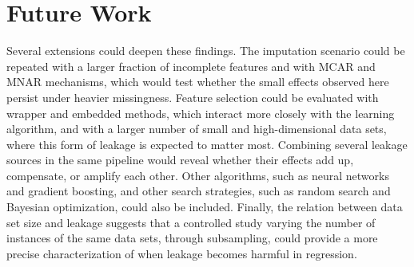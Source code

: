 \section{Future Work}

Several extensions could deepen these findings. The imputation scenario could be
repeated with a larger fraction of incomplete features and with MCAR and MNAR
mechanisms, which would test whether the small effects observed here persist
under heavier missingness. Feature selection could be evaluated with wrapper and
embedded methods, which interact more closely with the learning algorithm, and
with a larger number of small and high-dimensional data sets, where this form of
leakage is expected to matter most. Combining several leakage sources in the same
pipeline would reveal whether their effects add up, compensate, or amplify each
other. Other algorithms, such as neural networks and gradient boosting, and other
search strategies, such as random search and Bayesian optimization, could also be
included. Finally, the relation between data set size and leakage suggests that a
controlled study varying the number of instances of the same data sets, through
subsampling, could provide a more precise characterization of when leakage
becomes harmful in regression.
